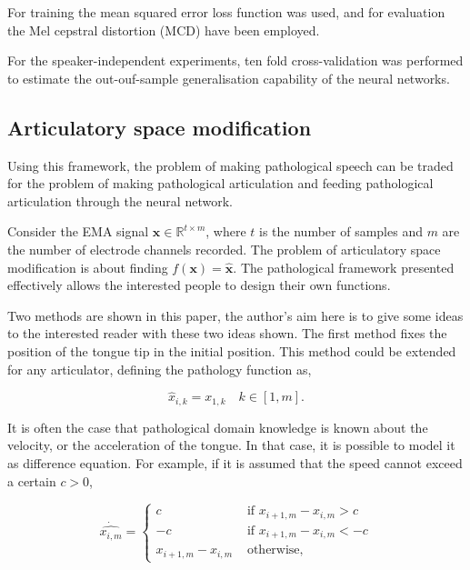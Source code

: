 \documentclass[a4paper]{article}
\begin{document}
For training the mean squared error loss function was used, and for
evaluation the Mel cepstral distortion (MCD) have been employed. \cite{Kubichek1993}

For the speaker-independent experiments, ten fold cross-validation was performed
to estimate the out-ouf-sample generalisation capability of the neural networks.

\subsection{Articulatory space modification} \label{section:speech}

Using this framework, the problem of making pathological speech
can be traded for the problem of making pathological articulation and
feeding pathological articulation through the neural network.

Consider the EMA signal \( \mathbf{x} \in \mathbb{R}^{t \times m} \), where \( t \) is
the number of samples and \( m \)  are the number of electrode channels
recorded. The problem of articulatory space modification is about finding
\( f(\mathbf{x}) = \mathbf{\hat{x}} \). The pathological
framework presented effectively allows the interested people to design
their own functions.

Two methods are shown in this paper, the author's aim here is to give some ideas
to the interested reader with these two ideas shown. The first method
fixes the position of the tongue tip in the initial position.
This method could be extended for any articulator, defining the pathology
function as, 

\begin{equation*}
  \hat{x}_{i,k} = x_{1,k} \quad k \in [1,m].
\end{equation*}

It is often the case that pathological domain knowledge is known about
the velocity, or the acceleration of the tongue. In that case, it is
possible to model it as difference equation. For example, if it is assumed
that the speed cannot exceed a certain \( c > 0 \),

\begin{equation*}
  \dot{\hat{{x_{i,m}}}} =
  \begin{cases}
    c & \text{ if $x_{i+1,m} - x_{i,m}> c$} \\
    -c & \text{ if $x_{i+1,m} - x_{i,m} < -c$} \\
    x_{i+1,m} - x_{i,m} & \text{ otherwise},
    \end{cases}
  \end{equation*}
\end{document}
